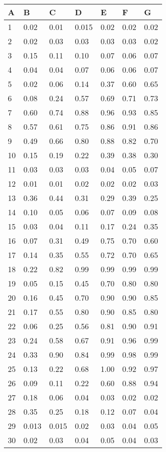 \documentclass[12pt]{article}
\begin{document}
 
\begin{tabular}{| l | l | l | l | l | l | l |}\hline A&B&C&D&E&F&G\\ \hline1&0.02&0.01&0.015&0.02&0.02&0.02\\2&0.02&0.03&0.03&0.03&0.03&0.02\\3&0.15&0.11&0.10&0.07&0.06&0.07\\4&0.04&0.04&0.07&0.06&0.06&0.07\\5&0.02&0.06&0.14&0.37&0.60&0.65\\6&0.08&0.24&0.57&0.69&0.71&0.73\\7&0.60&0.74&0.88&0.96&0.93&0.85\\8&0.57&0.61&0.75&0.86&0.91&0.86\\9&0.49&0.66&0.80&0.88&0.82&0.70\\10&0.15&0.19&0.22&0.39&0.38&0.30\\11&0.03&0.03&0.03&0.04&0.05&0.07\\12&0.01&0.01&0.02&0.02&0.02&0.03\\13&0.36&0.44&0.31&0.29&0.39&0.25\\14&0.10&0.05&0.06&0.07&0.09&0.08\\15&0.03&0.04&0.11&0.17&0.24&0.35\\16&0.07&0.31&0.49&0.75&0.70&0.60\\17&0.14&0.35&0.55&0.72&0.70&0.65\\18&0.22&0.82&0.99&0.99&0.99&0.99\\19&0.05&0.15&0.45&0.70&0.80&0.80\\20&0.16&0.45&0.70&0.90&0.90&0.85\\21&0.17&0.55&0.80&0.90&0.85&0.80\\22&0.06&0.25&0.56&0.81&0.90&0.91\\23&0.24&0.58&0.67&0.91&0.96&0.99\\24&0.33&0.90&0.84&0.99&0.98&0.99\\25&0.13&0.22&0.68&1.00&0.92&0.97\\26&0.09&0.11&0.22&0.60&0.88&0.94\\27&0.18&0.06&0.04&0.03&0.02&0.02\\28&0.35&0.25&0.18&0.12&0.07&0.04\\29&0.013&0.015&0.02&0.03&0.04&0.05\\30&0.02&0.03&0.04&0.05&0.04&0.03\\ \hline\end{tabular}
\end{document}
